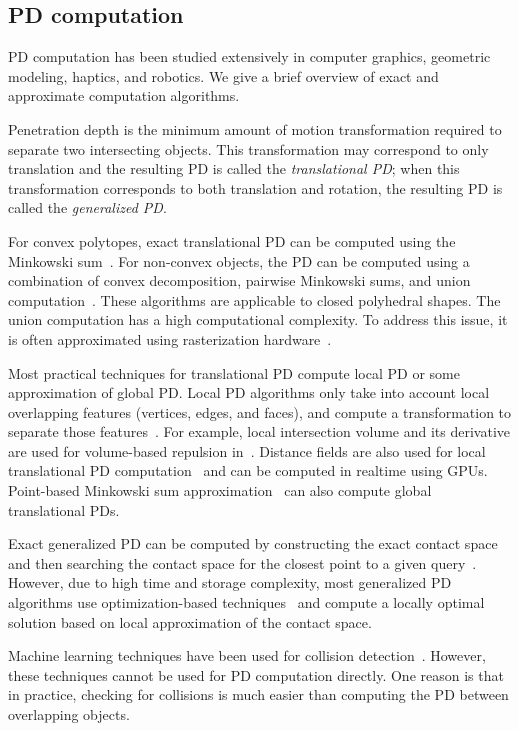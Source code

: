 \subsection{PD computation}
PD computation has been studied extensively in computer graphics,
geometric modeling, haptics, and robotics. We give a brief
overview of exact and approximate computation algorithms.

Penetration depth is the minimum amount of motion transformation required to separate two intersecting objects. This transformation may correspond to only translation and the resulting PD is called the \emph{translational PD}; when this transformation corresponds to both translation and rotation, the resulting PD is called the \emph{generalized PD}.

For convex polytopes, exact translational PD can be computed using
the Minkowski sum~\cite{Gino:2001:GDC,Agarwal:2000:CPD,Kim:2002:DEEP}.
For non-convex objects, the PD can be computed using a combination of convex decomposition, pairwise Minkowski sums, and union computation~\cite{Kim:2002:FPD}. These algorithms are applicable to closed polyhedral shapes. The union computation has a high computational complexity. To address this issue, it is often approximated using rasterization hardware~\cite{Kim:2002:FPD}.

Most practical techniques for translational PD compute local PD
or some approximation of global PD. Local PD algorithms only take
into account local overlapping features (vertices, edges, and faces),
and compute a transformation to separate those
features~\cite{Guendelman:2003:NRB,Redon:2006:AFM,Lien:2009:ASM,Tang:2009:IHD,Tang:2012:CPF}. For example, local intersection volume and its derivative are used for volume-based repulsion in~\cite{Wang12}.
Distance fields are also used for local translational PD
computation~\cite{Heidelberger04} and can be computed in realtime using GPUs.
Point-based Minkowski
sum approximation~\cite{Lien:2008:CMS} can also compute global translational PDs.

Exact generalized PD can be computed by constructing the
exact contact space and then searching the contact space for the
closest point to a given query~\cite{Zhang:2007:GPD}. However,
due to high time and storage complexity, most
generalized PD algorithms use optimization-based
techniques~\cite{Nawratil:2009:GPD,Zhang:2007:AFP,Je:2012:PRP,Tang:IGP:2013} and compute a locally
optimal solution based on local approximation of the contact space.

Machine learning techniques have been used for collision detection~\cite{Doshi:2007:ISRR,Pan:2011:ISRR}. However, these techniques cannot be used for PD computation directly. One reason is that in practice, checking for collisions is much easier than computing the PD between overlapping objects.

